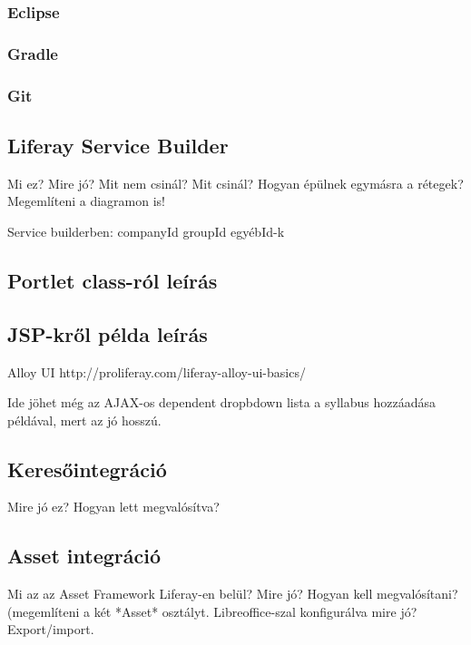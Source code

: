 \documentclass[hidelinks, 12pt, a4paper]{report}
\begin{document}
\subsubsection{Eclipse}

\subsubsection{Gradle}

\subsubsection{Git}

\subsection{Liferay Service Builder}

Mi ez? Mire jó? Mit nem csinál? Mit csinál?
Hogyan épülnek egymásra a rétegek? Megemlíteni a diagramon is!

Service builderben:
companyId
groupId
egyébId-k

\subsection{Portlet class-ról leírás}

\subsection{JSP-kről példa leírás}

Alloy UI http://proliferay.com/liferay-alloy-ui-basics/

Ide jöhet még az AJAX-os dependent dropbdown lista a syllabus hozzáadása példával, mert az jó hosszú.

\subsection{Keresőintegráció}

Mire jó ez? Hogyan lett megvalósítva?

\subsection{Asset integráció}

Mi az az Asset Framework Liferay-en belül? Mire jó? Hogyan kell megvalósítani? (megemlíteni a két *Asset* osztályt.
Libreoffice-szal konfigurálva mire jó? Export/import.
\end{document}
